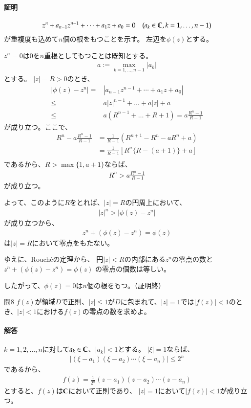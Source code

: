 \paragraph{証明}
\begin{align*}
    z^n+a_{n-1}z^{n-1}+\cdots+a_1z+a_0=0\quad(a_k\in\mathbb{C},k=1,\dots,n-1)
\end{align*}
が重複度も込めて$n$個の根をもつことを示す。
左辺を$\phi(z)$とする。

$z^n=0$は0を$n$重根としてもつことは既知とする。
\begin{align*}
    a:=\max_{k=1,\dots,n-1}|a_k|
\end{align*}
とする。
$|z|=R>0$のとき、
\begin{align*}
    |\phi(z)-z^n|=&|a_{n-1}z^{n-1}+\cdots+a_1z+a_0|\\
    \le&a|z|^{n-1}+\dots+a|z|+a\\
    \le&a(R^{n-1}+\dots+R+1)=a\frac{R^n-1}{R-1}
\end{align*}
が成り立つ。ここで、
\begin{align*}
    R^n-a\frac{R^n-1}{R-1}
    &=\frac{1}{R-1}(R^{n+1}-R^n-aR^n+a)\\
    &=\frac{1}{R-1}\left[R^{n}\{R-(a+1)\}+a\right]\\
\end{align*}
であるから、$R>\max\{1,a+1\}$ならば、
\begin{align*}
    R^n>a\frac{R^n-1}{R-1}
\end{align*}
が成り立つ。

よって、このように$R$をとれば、$|z|=R$の円周上において、
\begin{align*}
    |z|^n>|\phi(z)-z^n|
\end{align*}
が成り立つから、
\begin{align*}
    z^n+(\phi(z)-z^n)=\phi(z)
\end{align*}
は$|z|=R$において零点をもたない。

ゆえに、Rouch\'{e}の定理から、
円$|z|<R$の内部にある$z^n$の零点の数と\\
$z^n+(\phi(z)-z^n)=\phi(z)$
の零点の個数は等しい。

したがって、$\phi(z)=0$は$n$個の根をもつ。（証明終）


\newpage
\begin{mysimplebox}{問8}
    $f(z)$が領域$D$で正則、$|z|\le1$が$D$に包まれて、$|z|=1$では$|f(z)|<1$のとき、$|z|<1$における$f(z)$の零点の数を求めよ。
\end{mysimplebox}
\paragraph{解答}
$k=1,2,\dots,n$に対して$a_k\in\mathbb{C}$、$|a_k|<1$とする。
$|\xi|=1$ならば、
\begin{align*}
    |(\xi-a_1)(\xi-a_2)\cdots(\xi-a_n)|
    \le2^n
\end{align*}
であるから、
\begin{align*}
    f(z)=\frac{1}{2^n}(z-a_1)(z-a_2)\cdots(z-a_n)
\end{align*}
とすると、$f(z)$は$\mathbb{C}$において正則であり、
$|z|=1$において$|f(z)|<1$が成り立つ。

